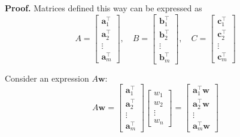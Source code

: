 \documentclass[../lecture-notes.tex]{subfiles}
\begin{document}
\textbf{Proof.} Matrices defined this way can be expressed as
\begin{equation*}
    A = \begin{bmatrix}
        \mathbf{a}_1^{\top} \\ \mathbf{a}_2^{\top} \\ \vdots \\ \mathbf{a}_m^{\top}
    \end{bmatrix}, \quad B = \begin{bmatrix}
        \mathbf{b}_1^{\top} \\ \mathbf{b}_2^{\top} \\ \vdots \\ \mathbf{b}_m^{\top}
    \end{bmatrix}, \quad C = \begin{bmatrix}
        \mathbf{c}_1^{\top} \\ \mathbf{c}_2^{\top} \\ \vdots \\ \mathbf{c}_m^{\top}
    \end{bmatrix}
\end{equation*}

Consider an expression $A\mathbf{w}$:
\begin{equation*}
    A\mathbf{w} = \begin{bmatrix}
        \mathbf{a}_1^{\top} \\ \mathbf{a}_2^{\top} \\ \vdots \\ \mathbf{a}_m^{\top}
    \end{bmatrix}\begin{bmatrix}
        w_1 \\ w_2 \\ \vdots \\ w_n
    \end{bmatrix} = \begin{bmatrix}
        \mathbf{a}_1^{\top}\mathbf{w} \\ \mathbf{a}_2^{\top}\mathbf{w} \\ \vdots \\ \mathbf{a}_m^{\top}\mathbf{w}
    \end{bmatrix}
\end{equation*}
\end{document}
